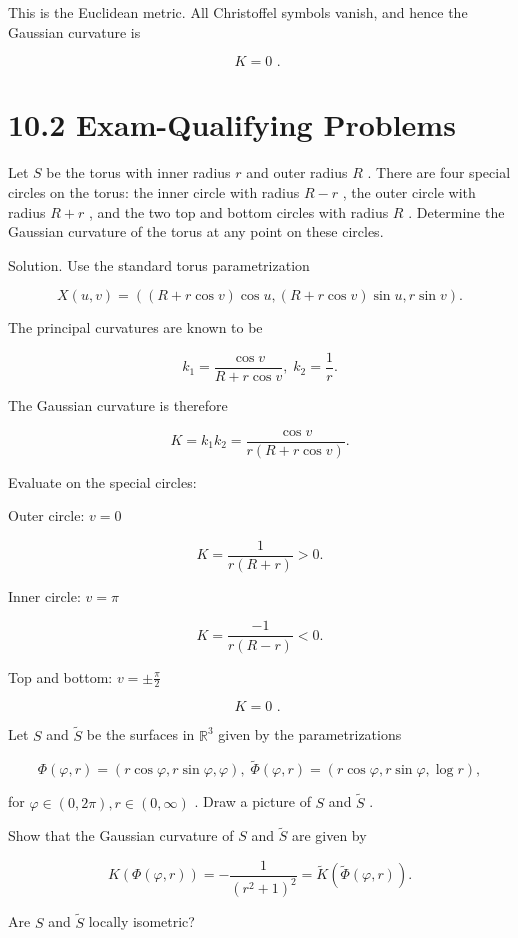 \documentclass[10pt]{article}
\begin{document}
This is the Euclidean metric. All Christoffel symbols vanish, and hence the Gaussian curvature is

\[
K = 0\text{ . }
\]

\section*{10.2 Exam-Qualifying Problems}

\begin{problem}[title=PROBLEM 4 (4 POINTS)]
Let \(S\) be the torus with inner radius \(r\) and outer radius \(R\) . There are four special circles on the torus: the inner circle with radius \(R - r\) , the outer circle with radius \(R + r\) , and the two top and bottom circles with radius \(R\) . Determine the Gaussian curvature of the torus at any point on these circles.
\end{problem}

Solution. Use the standard torus parametrization

\[
X\left( {u,v}\right)  = \left( {\left( {R + r\cos v}\right) \cos u,\left( {R + r\cos v}\right) \sin u,r\sin v}\right) .
\]

The principal curvatures are known to be

\[
{k}_{1} = \frac{\cos v}{R + r\cos v},\;{k}_{2} = \frac{1}{r}.
\]

The Gaussian curvature is therefore

\[
K = {k}_{1}{k}_{2} = \frac{\cos v}{r\left( {R + r\cos v}\right) }.
\]

Evaluate on the special circles:

Outer circle: \(v = 0\)

\[
K = \frac{1}{r\left( {R + r}\right) } > 0.
\]

Inner circle: \(v = \pi\)

\[
K = \frac{-1}{r\left( {R - r}\right) } < 0.
\]

Top and bottom: \(v =  \pm  \frac{\pi }{2}\)

\[
K = 0\text{ . }
\]

\begin{problem}[title=PROBLEM 5 (7 POINTS)]
Let \(S\) and \(\widetilde{S}\) be the surfaces in \({\mathbb{R}}^{3}\) given by the parametrizations

\[
\Phi \left( {\varphi ,r}\right)  = \left( {r\cos \varphi ,r\sin \varphi ,\varphi }\right) ,\;\widetilde{\Phi }\left( {\varphi ,r}\right)  = \left( {r\cos \varphi ,r\sin \varphi ,\log r}\right) ,
\]

for \(\varphi  \in  \left( {0,{2\pi }}\right) ,r \in  \left( {0,\infty }\right)\) . Draw a picture of \(S\) and \(\widetilde{S}\) .

Show that the Gaussian curvature of \(S\) and \(\widetilde{S}\) are given by

\[
K\left( {\Phi \left( {\varphi ,r}\right) }\right)  =  - \frac{1}{{\left( {r}^{2} + 1\right) }^{2}} = \widetilde{K}\left( {\widetilde{\Phi }\left( {\varphi ,r}\right) }\right) .
\]

Are \(S\) and \(\widetilde{S}\) locally isometric?
\end{problem}
\end{document}
